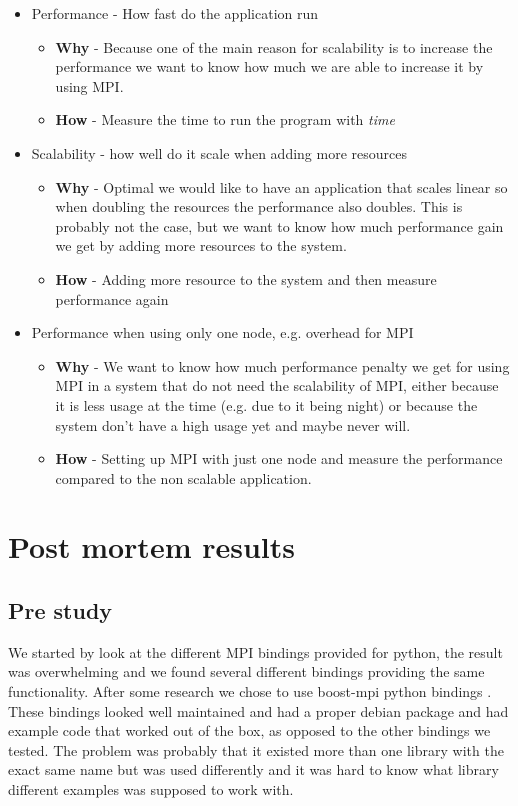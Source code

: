 \documentclass{article}
\begin{document}
{\begin{itemize}
\begin{itemize}
{when using MPI it maybe isn't feasible to write applications that
needs to be extended further on with MPI.}
\item{ \textbf{How} - Measure how much work it takes to extend the application with 
		some example feature}
\end{itemize}
\item Performance - How fast do the application run
\begin{itemize}
\item{ \textbf{Why} - Because one of the main reason for scalability is to increase the
 performance we want to know how much we are able to increase it by using MPI. }
\item{ \textbf{How} - Measure the time to run the program with \emph{time}}
\end{itemize}
\item Scalability - how well do it scale when adding more resources
\begin{itemize}
\item{ \textbf{Why} - Optimal we would like to have an application that scales linear
 so when doubling the resources the performance also doubles. This is probably 
 not the case, but we want to know how much performance gain we get by adding
 more resources to the system. }
\item{ \textbf{How} - Adding more resource to the system and then measure performance
 again}
\end{itemize}
\item Performance when using only one node, e.g. overhead for MPI
\begin{itemize}
\item{ \textbf{Why} - We want to know how much performance penalty we get for using
MPI in a system that do not need the scalability of MPI, either because it is 
less usage at the time (e.g. due to it being night) or because the system
don't have a high usage yet and maybe never will.}
\item{ \textbf{How} - Setting up MPI with just one node and measure the performance
 compared to the non scalable application. }
\end{itemize}
\end{itemize}


\section{Post mortem results}\label{mpi}
\subsection{Pre study}
We started by look at the different MPI bindings provided for python, the result
was overwhelming and we found several different bindings providing the same
functionality. After some research we chose to use boost-mpi python bindings
\cite{boost-mpi}. These bindings looked well maintained and had a proper
debian package and had example code that worked out of the box, as opposed to
the other bindings we tested. The problem was probably that it existed more
than one library with the exact same name but was used differently and it was
hard to know what library different examples was supposed to work with. 

}
\end{document}
